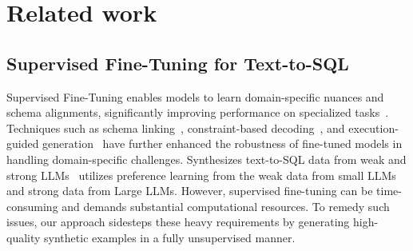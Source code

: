 \section{Related work}


\subsection{Supervised Fine-Tuning for Text-to-SQL}
Supervised Fine-Tuning enables models to learn domain-specific nuances and schema alignments, significantly improving performance on specialized tasks~\cite{sft_enhancing}. Techniques such as schema linking~\cite{schema_enhance}, constraint-based decoding~\cite{autoregressive_decoding}, and execution-guided generation~\cite{tool_assisted} have further enhanced the robustness of fine-tuned models in handling domain-specific challenges. Synthesizes text-to-SQL data from weak and strong LLMs~\cite{synthesize} utilizes preference learning from the weak data from small LLMs and strong data from Large LLMs. %
However, supervised fine-tuning can be time-consuming and demands substantial computational resources. To remedy such issues, our approach sidesteps these heavy requirements by generating high-quality synthetic examples in a fully unsupervised manner.

